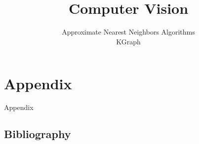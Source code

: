 
\title{Computer Vision}
\subtitle{Approximate Nearest Neighbors Algorithms \\ KGraph}




	
	
	
%	
	
%	
	
	
	
	\section*{Appendix}
	\begin{frame}
		\Huge
		Appendix
	\end{frame}
%	
	\subsection*{Bibliography}
		
	
		
